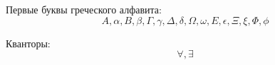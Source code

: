 \documentclass[a4paper, 12pt]{article}
\begin{document}
    Первые буквы греческого алфавита:
    \[A, \alpha, B, \beta, \Gamma, \gamma, \Delta, \delta, \Omega, \omega, E, \epsilon, \Xi, \xi, \Phi, \phi\]

    Кванторы:
    \[\forall, \exists\]
\end{document}

